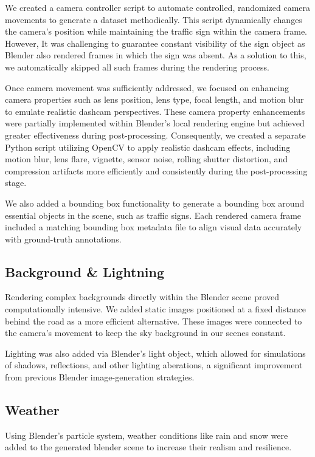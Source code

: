 \documentclass[journal]{IEEEtran}
\begin{document}
We created a camera controller script to automate controlled, randomized camera movements to generate a dataset methodically. This script dynamically changes the camera's position while maintaining the traffic sign within the camera frame. However, It was challenging to guarantee constant visibility of the sign object as Blender also rendered frames in which the sign was absent. As a solution to this, we automatically skipped all such frames during the rendering process.

Once camera movement was sufficiently addressed, we focused on enhancing camera properties such as lens position, lens type, focal length, and motion blur to emulate realistic dashcam perspectives. These camera property enhancements were partially implemented within Blender's local rendering engine but achieved greater effectiveness during post-processing. Consequently, we created a separate Python script utilizing OpenCV to apply realistic dashcam effects, including motion blur, lens flare, vignette, sensor noise, rolling shutter distortion, and compression artifacts more efficiently and consistently during the post-processing stage.

We also added a bounding box functionality to generate a bounding box around essential objects in the scene, such as traffic signs. Each rendered camera frame included a matching bounding box metadata file to align visual data accurately with ground-truth annotations.

\subsection{Background \& Lightning}
Rendering complex backgrounds directly within the Blender scene proved computationally intensive. We added static images positioned at a fixed distance behind the road as a more efficient alternative. These images were connected to the camera's movement to keep the sky background in our scenes constant.

Lighting was also added via Blender's light object, which allowed for simulations of shadows, reflections, and other lighting aberations, a significant improvement from previous Blender image-generation strategies\cite{blender_paper}. 

\subsection{Weather}
Using Blender's particle system, weather conditions like rain and snow were added to the generated blender scene to increase their realism and resilience.
\end{document}

